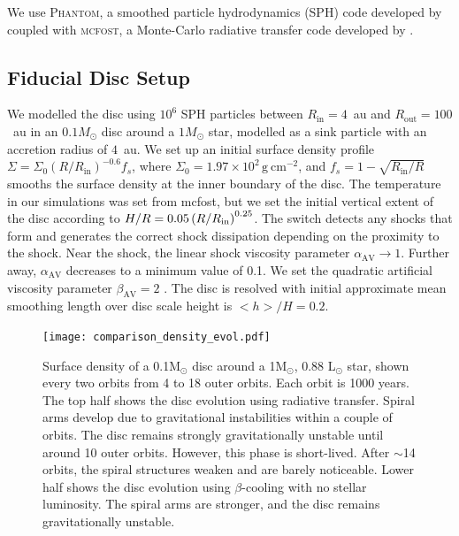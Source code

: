 \documentclass[usenatbib]{mnras}
\begin{document}
We use \textsc{Phantom}, a smoothed particle hydrodynamics (SPH) code developed by \cite{2018Price} coupled with \textsc{mcfost}, a Monte-Carlo radiative transfer code developed by \cite{2006Pinte,2009Pinte}. 

\subsection{Fiducial Disc Setup}

We modelled the disc using $10^6$ SPH particles between $R_{\mathrm{in}} = 4$~au and $R_\mathrm{out} = 100$~au in an $0.1M_{\odot}$ disc around a $1M_{\odot}$ star, modelled as a sink particle with an accretion radius of $4$~au. We set up an initial surface density profile $\Sigma = \Sigma_{0}  \left ( {R}/{R_{\mathrm{in}}} \right)^{-0.6} f_{s}$,
where ${\Sigma_{0} = 1.97 \times 10^2\,\mathrm{g\ cm}^{-2}}$,  and ${f_{s} = 1-\sqrt{R_\mathrm{in}/R}}$ smooths the surface density at the inner boundary of the disc. The temperature in our simulations was set from {\sc mcfost}, but we set the initial vertical extent of the disc according to $H/R = 0.05 \left ( {R}/{R_{\rm in}} \right)^{0.25}$. The \cite{2010Cullen} switch detects any shocks that form and generates the correct shock dissipation depending on the proximity to the shock. Near the shock, the linear shock viscosity parameter $\alpha_{\text{AV}}\to 1$. Further away, $\alpha_{\text{AV}}$ decreases to a minimum value of 0.1. We set the quadratic artificial viscosity parameter $\beta_{\text{AV}}=2$  \cite[][]{2015Nealon,2018Price}. The disc is resolved with initial approximate mean smoothing length over disc scale height is ${<}h{>} / H = 0.2$.

\begin{figure}
    \centering
    \texttt{[image: comparison\_density\_evol.pdf]}
    \caption{Surface density of a 0.1M$_\odot$ disc around a 1M$_\odot$, 0.88 L$_\odot$ star, shown every two orbits from 4 to 18 outer orbits. Each orbit is 1000 years. The top half shows the disc evolution using radiative transfer. Spiral arms develop due to gravitational instabilities within a couple of orbits. The disc remains strongly gravitationally unstable until around 10 outer orbits. However, this phase is short-lived. After ${\sim}$14 orbits, the spiral structures weaken and are barely noticeable. Lower half shows the disc evolution using $\beta$-cooling with no stellar luminosity. The spiral arms are stronger, and the disc remains gravitationally unstable.}
    \label{fig:densityEvol}
\end{figure}
\end{document}
